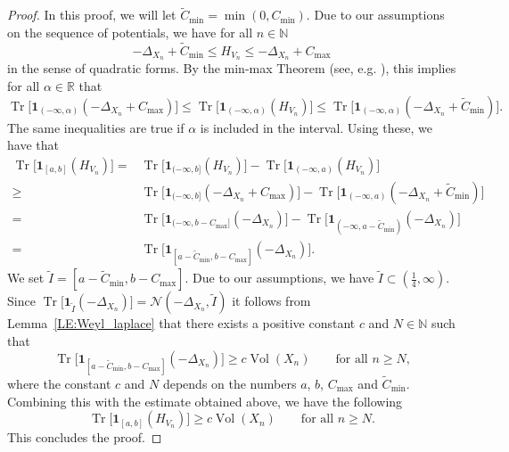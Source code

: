 \documentclass[11pt,twoside,reqno]{amsart}
\newcommand{\R}{\mathbb{R}}
\newcommand{\N}{\mathbb{N}}
\newcommand{\1}{\mathrm{\mathbf{1}}}
\DeclareMathOperator{\Vol}{Vol}
\DeclareMathOperator{\Tr}{Tr}
\numberwithin{equation}{section}
\theoremstyle{plain}
\theoremstyle{definition}
\theoremstyle{remark}
\begin{document}
\begin{proof}
In this proof, we will let $\widetilde{C}_{\min}= \min(0,C_{\min})$. Due to our assumptions on the sequence of potentials, we have for all $n\in\N$
\begin{equation*}
    -\Delta_{X_n}+\widetilde{C}_{\min} \leq H_{V_n} \leq  -\Delta_{X_n}+ C_{\max}
\end{equation*}
in the sense of quadratic forms. By the min-max Theorem (see, e.g. \cite[Chapter XIII]{ReedSimonIV}), this implies for all $\alpha\in\R$ that
\begin{equation*}
    \Tr\big[ \boldsymbol{1}_{(-\infty, \alpha)}(-\Delta_{X_n}+ C_{\max}) \big] \leq \Tr\big[ \boldsymbol{1}_{(-\infty, \alpha)}(H_{V_n}) \big] \leq \Tr\big[ \boldsymbol{1}_{(-\infty, \alpha)}(-\Delta_{X_n}+ \widetilde{C}_{\min}) \big].
\end{equation*}
The same inequalities are true if $\alpha$ is included in the interval. Using these, we have that
\begin{equation*}
    \begin{aligned}
    \Tr\big[ \boldsymbol{1}_{[a,b]}(H_{V_n}) \big] 
    ={}& \Tr\big[ \boldsymbol{1}_{(-\infty,b]}(H_{V_n}) \big] - \Tr\big[ \boldsymbol{1}_{(-\infty,a)}(H_{V_n}) \big] 
    \\
    \geq{}& \Tr\big[ \boldsymbol{1}_{(-\infty,b]}(-\Delta_{X_n}+ C_{\max}) \big] - \Tr\big[ \boldsymbol{1}_{(-\infty,a)}(-\Delta_{X_n}+ \widetilde{C}_{\min}) \big]
    \\
    ={}& \Tr\big[ \boldsymbol{1}_{(-\infty,b- C_{\max}]}(-\Delta_{X_n}) \big] - \Tr\big[ \boldsymbol{1}_{(-\infty,a-\widetilde{C}_{\min})}(-\Delta_{X_n}) \big]
    \\
    ={}& \Tr\big[ \boldsymbol{1}_{[a-\widetilde{C}_{\min},b- C_{\max}]}(-\Delta_{X_n}) \big].
    \end{aligned}
\end{equation*}
We set $\tilde{I} = [a-\widetilde{C}_{\min},b- C_{\max}]$. Due to our assumptions, we have $\tilde{I} \subset (\frac{1}{4},\infty)$.  Since $\Tr\big[ \boldsymbol{1}_{\tilde{I}}(-\Delta_{X_n}) \big] = \mathcal{N}(-\Delta_{X_n},\tilde{I})$ it follows from Lemma~\ref{LE:Weyl_laplace} that there exists a positive constant $c$ and $N\in \N$ such that 
\begin{equation*}
    \Tr\big[ \boldsymbol{1}_{[a-\widetilde{C}_{\min},b- C_{\max}]}(-\Delta_{X_n}) \big] \geq c \Vol(X_n) \qquad\text{for all $n\geq N$,}
\end{equation*}
where the constant $c$ and $N$ depends on the numbers $a$, $b$, $C_{\max}$ and $\widetilde{C}_{\min}$. Combining this with the estimate obtained above, we have the following
\begin{equation*}
    \Tr\big[ \boldsymbol{1}_{[a,b]}(H_{V_n}) \big] \geq c \Vol(X_n) \qquad\text{for all $n\geq N$.}
\end{equation*}
This concludes the proof.
\end{proof}
\end{document}
